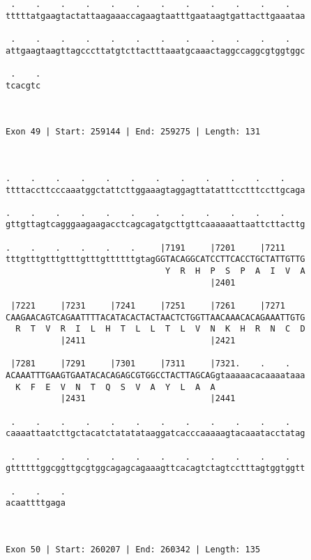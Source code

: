 \documentclass{article}
\begin{document}
\begin{Verbatim}
 .    .    .    .    .    .    .    .    .    .    .    .   
tttttatgaagtactattaagaaaccagaagtaatttgaataagtgattacttgaaataa
                                                            
 .    .    .    .    .    .    .    .    .    .    .    .   
attgaagtaagttagcccttatgtcttactttaaatgcaaactaggccaggcgtggtggc
                                                            
 .    .
tcacgtc
       
       
 
Exon 49 | Start: 259144 | End: 259275 | Length: 131



.    .    .    .    .    .    .    .    .    .    .    .    
ttttaccttcccaaatggctattcttggaaagtaggagttatatttcctttccttgcaga
                                                            
.    .    .    .    .    .    .    .    .    .    .    .    
gttgttagtcagggaagaagacctcagcagatgcttgttcaaaaaattaattcttacttg
                                                            
.    .    .    .    .    .     |7191     |7201     |7211    
tttgtttgtttgtttgtttgttttttgtagGGTACAGGCATCCTTCACCTGCTATTGTTG
                                Y  R  H  P  S  P  A  I  V  A
                                         |2401              
  
 |7221     |7231     |7241     |7251     |7261     |7271    
CAAGAACAGTCAGAATTTTACATACACTACTAACTCTGGTTAACAAACACAGAAATTGTG
  R  T  V  R  I  L  H  T  L  L  T  L  V  N  K  H  R  N  C  D
           |2411                         |2421              
  
 |7281     |7291     |7301     |7311     |7321.    .    .   
ACAAATTTGAAGTGAATACACAGAGCGTGGCCTACTTAGCAGgtaaaaacacaaaataaa
  K  F  E  V  N  T  Q  S  V  A  Y  L  A  A                  
           |2431                         |2441              
  
 .    .    .    .    .    .    .    .    .    .    .    .   
caaaattaatcttgctacatctatatataaggatcacccaaaaagtacaaatacctatag
                                                            
 .    .    .    .    .    .    .    .    .    .    .    .   
gttttttggcggttgcgtggcagagcagaaagttcacagtctagtcctttagtggtggtt
                                                            
 .    .    .
acaattttgaga
            
            
 
Exon 50 | Start: 260207 | End: 260342 | Length: 135




\end{Verbatim}
\end{document}
